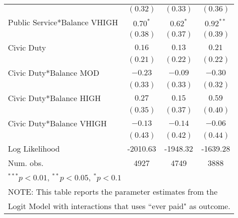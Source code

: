 \documentclass[12pt,titlepage]{article}
\begin{document}
\begin{table}[htbp]
\begin{center}
\begin{tabular}{|l|c|c|c|}
                             & $(0.32)$      & $(0.33)$      & $(0.36)$      \\
Public Service*Balance VHIGH & $0.70^{*}$    & $0.62^{*}$    & $0.92^{**}$   \\
                             & $(0.38)$      & $(0.37)$      & $(0.39)$      \\
Civic Duty                   & $0.16$        & $0.13$        & $0.21$        \\
                             & $(0.21)$      & $(0.22)$      & $(0.22)$      \\
Civic Duty*Balance MOD       & $-0.23$       & $-0.09$       & $-0.30$       \\
                             & $(0.33)$      & $(0.33)$      & $(0.32)$      \\
Civic Duty*Balance HIGH      & $0.27$        & $0.15$        & $0.59$        \\
                             & $(0.35)$      & $(0.37)$      & $(0.40)$      \\
Civic Duty*Balance VHIGH     & $-0.13$       & $-0.14$       & $-0.06$       \\
                             & $(0.43)$      & $(0.42)$      & $(0.44)$      \\
\hline
Log Likelihood               & -2010.63      & -1948.32      & -1639.28      \\
Num. obs.                    & 4927          & 4749          & 3888          \\
\hline
\multicolumn{4}{l}{\scriptsize{$^{***}p<0.01$, $^{**}p<0.05$, $^*p<0.1$}} \\
\multicolumn{4}{l}{NOTE: This table reports the parameter estimates from the} \\
\multicolumn{4}{l}{Logit Model with interactions that uses ``ever paid" as outcome.} \\
\end{tabular}
\label{table:ep_log_II}
\end{center}
\end{table}
\end{document}
